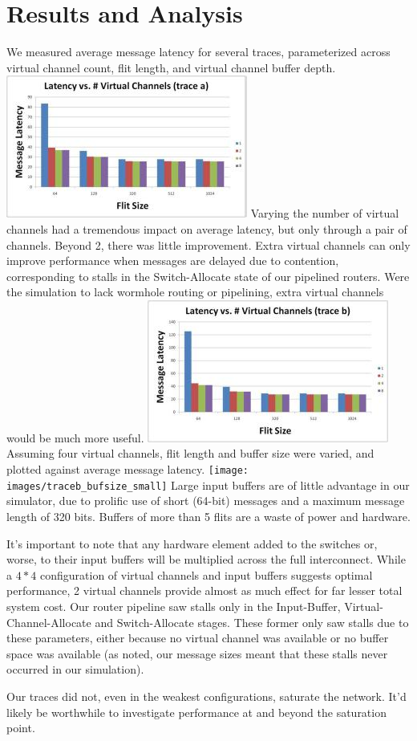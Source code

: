 \documentclass[twocolumn]{article}
\begin{document}
\section{Results and Analysis}
We measured average message latency for several traces, parameterized across
virtual channel count, flit length, and virtual channel buffer depth.
\includegraphics{images/trace_avc_small}
Varying the number of virtual channels had a tremendous impact on average
latency, but only through a pair of channels. Beyond 2, there was little
improvement. Extra virtual channels can only improve performance when messages
are delayed due to contention, corresponding to stalls in the Switch-Allocate
state of our pipelined routers. Were the simulation to lack wormhole routing
or pipelining, extra virtual channels would be much more useful.
\includegraphics{images/trace_bvc_small}
\newpage
Assuming four virtual channels, flit length and buffer size were varied, and
plotted against average message latency.
\texttt{[image: images/traceb\_bufsize\_small]}
Large input buffers are of little advantage in our simulator, due to prolific
use of short (64-bit) messages and a maximum message length of 320 bits. Buffers
of more than 5 flits are a waste of power and hardware.

It's important to note that any hardware element added to the switches or,
worse, to their input buffers will be multiplied across the full interconnect.
While a $4*4$ configuration of virtual channels and input buffers suggests
optimal performance, 2 virtual channels provide almost as much effect for far
lesser total system cost. Our router pipeline saw stalls only in the
Input-Buffer, Virtual-Channel-Allocate and Switch-Allocate stages. These former
only saw stalls due to these parameters, either because no virtual channel was
available or no buffer space was available (as noted, our message sizes meant
that these stalls never occurred in our simulation).

Our traces did not, even in the weakest configurations, saturate the network. It'd
likely be worthwhile to investigate performance at and beyond the saturation point.
\end{document}
